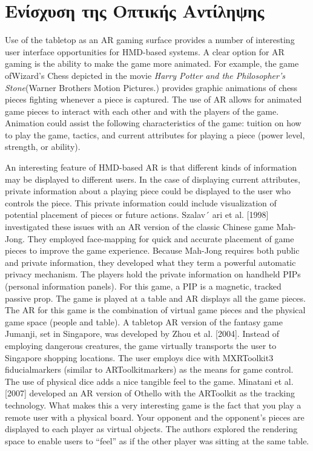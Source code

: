 \section{Ενίσχυση της Οπτικής Αντίληψης}


Use of the tabletop as an AR gaming surface provides a number of interesting user interface opportunities for HMD-based systems. A clear option for AR gaming is the ability to make the game more animated. For example, the game ofWizard’s Chess depicted in the movie \textit{Harry Potter and the Philosopher’s Stone}(Warner Brothers Motion Pictures.) provides graphic animations of chess pieces fighting whenever a piece is captured. The use of AR allows for animated game pieces to interact with each other and with the players of the game. Animation could assist the following characteristics of the game: tuition on how to play the game, tactics, and current attributes for playing a piece (power level, strength, or ability).

An interesting feature of HMD-based AR is that different kinds of information may be displayed to different users. In the case of displaying current attributes, private information about a playing piece could be displayed to the user who controls the piece. This private information could include visualization of potential placement of pieces or future actions. Szalav´ ari et al. [1998] investigated these issues with an AR version of the classic Chinese game Mah-Jong. They employed face-mapping for quick and accurate placement of game pieces to improve the game experience. Because Mah-Jong requires both public and private information, they developed what they term a powerful automatic privacy mechanism. The players hold the private information on handheld PIPs (personal information panels). For this game, a PIP is a magnetic, tracked passive prop. The game is played at a table and AR displays all the game pieces. The AR for this game is the combination of virtual game pieces and the physical game space (people and table).
A tabletop AR version of the fantasy game Jumanji, set in Singapore, was developed by Zhou et al. [2004]. Instead of employing dangerous creatures, the game virtually transports the user to Singapore shopping locations. The user employs dice with MXRToolkit3 fiducialmarkers (similar to ARToolkitmarkers) as the means for game control. The use of physical dice adds a nice tangible feel to the game. Minatani et al. [2007] developed an AR version of Othello with the ARToolkit as the tracking technology. What makes this a very interesting game is the fact that you play a remote user with a physical board. Your opponent and the opponent’s pieces are displayed to each player as virtual objects. The authors explored the rendering space to enable users to “feel” as if the other player was sitting at the same table.


